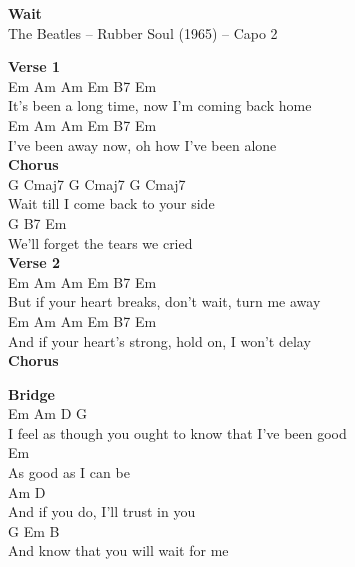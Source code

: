 \documentclass[a4paper]{article}
\begin{document}
    \begin{center}
        \textbf{Wait}
        ~\\
        The Beatles -- Rubber Soul (1965)
         -- Capo 2
    \end{center}
    {
        \scriptsize
        \textbf{Verse 1}
        ~\\
        {
            \cutive
            \obeyspaces
Em          Am         Am  Em  B7          Em
\\
It's been a long time, now I'm coming back home
\\
           Em  Am   Am Em  B7         Em
\\
I've been away now, oh how I've been alone
\\

        }
        \textbf{Chorus}
        ~\\
        {
            \cutive
            \obeyspaces
G Cmaj7       G         Cmaj7   G  Cmaj7
\\
Wait   till I come back to your side
\\
         G       B7       Em
\\
We'll forget the tears we cried
\\

        }
        \textbf{Verse 2}
        ~\\
        {
            \cutive
            \obeyspaces
            Em    Am      Am    Em    B7       Em
\\
But if your heart breaks, don't wait, turn me away
\\
            Em      Am      Am   Em  B7        Em
\\
And if your heart's strong, hold on, I won't delay 
\\

        }
        \textbf{Chorus}
        ~\\
        {
            \cutive
            \obeyspaces

        }
        \textbf{Bridge}
        ~\\
        {
            \cutive
            \obeyspaces
Em        Am                  D                   G
\\
I feel as though you ought to know that I've been good
\\
                 Em
\\
As good as I can be
\\
           Am                D
\\
And if you do, I'll trust in you
\\
              G                 Em  B
\\
And know that you will wait for me
\\

}}
\end{document}
